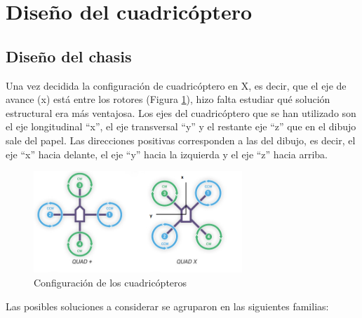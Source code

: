 \documentclass[12pt,twoside]{article}
\begin{document}
  \newpage
	\section{Diseño del cuadricóptero}\label{sec:diseno}


		\subsection{Diseño del chasis}\label{subsec:diseno_chasis}
Una vez decidida la configuración de cuadricóptero en X, es decir, que el eje de avance (x) está entre los rotores (Figura \ref{fig:configuracion_quad}), hizo falta estudiar qué solución estructural era más ventajosa. Los ejes del cuadricóptero que se han utilizado son el eje longitudinal “x”, el eje transversal “y” y el restante eje “z” que en el dibujo sale del papel. Las direcciones positivas corresponden a las del dibujo, es decir, el eje “x” hacia delante, el eje “y” hacia la izquierda y el eje “z” hacia arriba.

		\begin{figure}
			\centering
			\includegraphics[width=0.7\textwidth]{Imatges/Disseny_Chasis/Quad_eixos.png}
			\caption{Configuración de los cuadricópteros}
			\label{fig:configuracion_quad}
		\end{figure}
		
Las posibles soluciones a considerar se agruparon en las siguientes familias:
\end{document}
